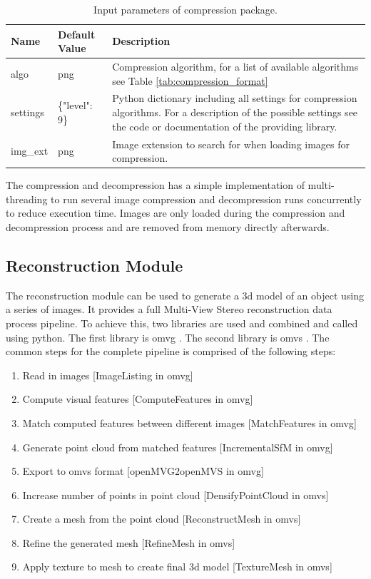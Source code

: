 \begin{table}[htb]
    \centering
    \caption{Input parameters of compression package.}
    \label{tab:compression_settings}
    \begin{tabular}{p{}|p{}|p{}}
        \textbf{Name} & \textbf{Default Value} & \textbf{Description} \\ \hline
        algo    & png          & Compression algorithm, for a list of available algorithms see Table \ref{tab:compression_format}\\
        settings    & \{"level": 9\} & Python dictionary including all settings for compression algorithms. For a description of the possible settings see the code or documentation of the providing library. \\
        img\_ext    & png          & Image extension to search for when loading images for compression. 
    \end{tabular}
\end{table}

The compression and decompression has a simple implementation of multi-threading to run several image compression and decompression runs concurrently to reduce execution time. Images are only loaded during the compression and decompression process and are removed from memory directly afterwards.

\subsection{Reconstruction Module}
The reconstruction module can be used to generate a \gls{3d} model of an object using a series of images. It provides a full Multi-View Stereo reconstruction data process pipeline. To achieve this, two libraries are used and combined and called using python. The first library is \gls{omvg} \cite{openMVG}. The second library is \gls{omvs} \cite{openMVS}. 
The common steps for the complete pipeline is comprised of the following steps:
\begin{enumerate}
    \item Read in images [ImageListing in \gls{omvg}]
    \item Compute visual features [ComputeFeatures in \gls{omvg}]
    \item Match computed features between different images [MatchFeatures in \gls{omvg}]
    \item Generate point cloud from matched features [IncrementalSfM in \gls{omvg}]
    \item Export to \gls{omvs} format [openMVG2openMVS in \gls{omvg}]
    \item Increase number of points in point cloud [DensifyPointCloud in \gls{omvs}]
    \item Create a mesh from the point cloud [ReconstructMesh in \gls{omvs}]
    \item Refine the generated mesh [RefineMesh in \gls{omvs}]
    \item Apply texture to mesh to create final \gls{3d} model [TextureMesh in \gls{omvs}]
\end{enumerate}

